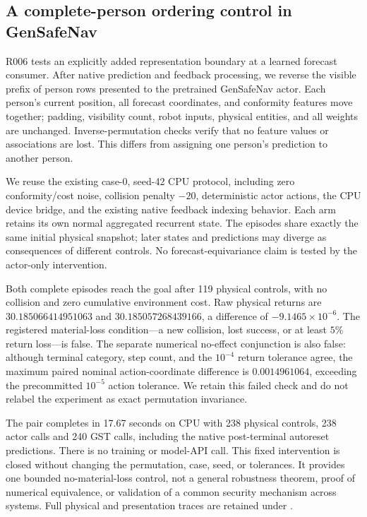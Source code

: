 \subsection{A complete-person ordering control in GenSafeNav}
R006 tests an explicitly added representation boundary at a learned forecast
consumer. After native prediction and feedback processing, we reverse the
visible prefix of person rows presented to the pretrained GenSafeNav actor.
Each person's current position, all forecast coordinates, and conformity
features move together; padding, visibility count, robot inputs, physical
entities, and all weights are unchanged. Inverse-permutation checks verify
that no feature values or associations are lost. This differs from assigning
one person's prediction to another person.

We reuse the existing case-0, seed-42 CPU protocol, including zero
conformity/cost noise, collision penalty $-20$, deterministic actor actions,
the CPU device bridge, and the existing native feedback indexing behavior.
Each arm retains its own normal aggregated recurrent state. The episodes
share exactly the same initial physical snapshot; later states and predictions
may diverge as consequences of different controls. No forecast-equivariance
claim is tested by the actor-only intervention.

Both complete episodes reach the goal after 119 physical controls, with no
collision and zero cumulative environment cost. Raw physical returns are
$30.185066414951063$ and $30.185057268439166$, a difference of
$-9.1465\times10^{-6}$. The registered material-loss condition---a new
collision, lost success, or at least $5\%$ return loss---is false.
The separate numerical no-effect conjunction is also false: although
terminal category, step count, and the $10^{-4}$ return tolerance agree,
the maximum paired nominal action-coordinate difference is $0.0014961064$,
exceeding the precommitted $10^{-5}$ action tolerance. We retain this failed
check and do not relabel the experiment as exact permutation invariance.

The pair completes in 17.67 seconds on CPU with 238 physical controls,
238 actor calls and 240 GST calls, including the native post-terminal
autoreset predictions. There is no training or model-API call. This fixed
intervention is closed without changing the permutation, case, seed, or
tolerances. It provides one bounded no-material-loss control, not a general
robustness theorem, proof of numerical equivalence, or validation of a common
security mechanism across systems. Full physical and presentation traces
are retained under .
